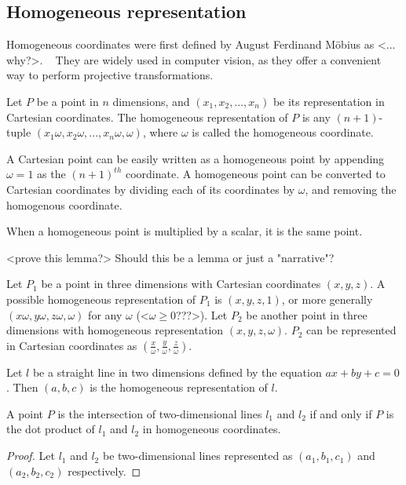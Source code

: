 \documentclass[11pt, oneside, reqno]{book}
\begin{document}
\subsection{Homogeneous representation}
Homogeneous coordinates were first defined by August Ferdinand M\"{o}bius as <... why?>. ~\cite{history} They are widely used in computer vision, as they offer a convenient way to perform projective transformations.

\begin{definition}  
\label{def:hpoint}
Let $P$ be a point in $n$ dimensions, and $(x_1, x_2, ..., x_n)$ be its representation in Cartesian coordinates. The homogeneous representation of $P$ is any $(n+1)$-tuple $(x_1\omega, x_2\omega, ..., x_n\omega, \omega)$, where $\omega$ is called the homogeneous coordinate. 
\end{definition}

A Cartesian point can be easily written as a homogeneous point by appending $\omega=1$ as the $(n+1)^{th}$ coordinate. A homogeneous point can be converted to Cartesian coordinates by dividing each of its coordinates by $\omega$, and removing the homogenous coordinate.

\begin{lemma}
\label{lem:multHpoint}
When a homogeneous point is multiplied by a scalar, it is the same point.
\end{lemma}
<prove this lemma?> Should this be a lemma or just a "narrative"?

\begin{example}
\label{ex:cartHomo}
Let $P_1$ be a point in three dimensions with Cartesian coordinates $(x,y,z)$. A possible homogeneous representation of $P_1$ is $(x,y,z,1)$, or more generally $(x\omega, y\omega, z\omega, \omega)$ for any $\omega$ (<$\omega \ge 0$???>).
Let $P_2$ be another point in three dimensions with homogeneous representation $(x,y,z,\omega)$. $P_2$ can be represented in Cartesian coordinates as $\left(\frac{x}{\omega}, \frac{y}{\omega}, \frac{z}{\omega}\right)$.
\end{example}

\begin{definition} 
\label{def:hline}
Let $l$ be a straight line in two dimensions defined by the equation $ax+by+c = 0$. Then $(a,b,c)$ is the homogeneous representation of $l$.
\end{definition}

\begin{lemma}
\label{lem:intersect}
A point $P$ is the intersection of two-dimensional lines $l_1$ and $l_2$ if and only if $P$ is the dot product of $l_1$ and $l_2$ in homogeneous coordinates.
\end{lemma}
\begin{proof}
Let $l_1$ and $l_2$ be two-dimensional lines represented as $(a_1,b_1,c_1)$ and $(a_2,b_2,c_2)$ respectively. 
\end{proof}
\end{document}
